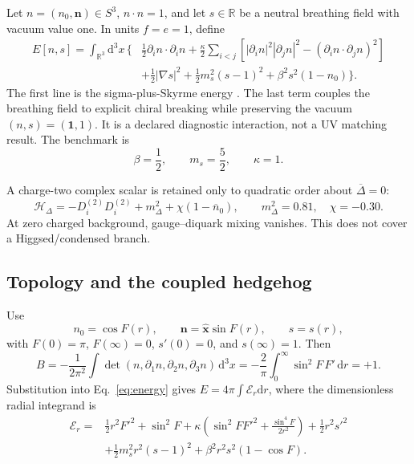 \documentclass[11pt]{article}
\theoremstyle{definition}
\theoremstyle{remark}
\newcommand{\dd}{\mathrm d}
\newcommand{\cH}{\mathcal H}
\newcommand{\RR}{\mathbb R}
\newcommand{\one}{\mathbf 1}
\begin{document}
Let \(n=(n_0,\bm n)\in S^3\), \(n\cdot n=1\), and let \(s\in\RR\) be a
neutral breathing field with vacuum value one.  In units \(f=e=1\), define
\begin{align}
 E[n,s]=\int_{\RR^3}\!\dd^3x\,\bigg\{&
 \frac12\partial_i n\cdot\partial_i n
 +\frac{\kappa}{2}\sum_{i<j}
 \left[|\partial_i n|^2|\partial_j n|^2
 -(\partial_i n\cdot\partial_j n)^2\right]\nonumber\\
 &+\frac12|\nabla s|^2+\frac12m_s^2(s-1)^2
 +\beta^2s^2(1-n_0)\bigg\}.
 \label{eq:energy}
\end{align}
The first line is the sigma-plus-Skyrme energy
\cite{Skyrme1961APE6,AdkinsNappiWitten1983APE6}.  The last term couples the
breathing field to explicit chiral breaking while preserving the vacuum
\((n,s)=(\one,1)\).  It is a declared diagnostic interaction, not a UV
matching result.  The benchmark is
\begin{equation}
 \beta=\frac12,\qquad m_s=\frac52,\qquad \kappa=1.
 \label{eq:parameters}
\end{equation}

A charge-two complex scalar is retained only to quadratic order about
\(\overline\Delta=0\):
\begin{equation}
 \cH_\Delta=-D_i^{(2)}D_i^{(2)}+m_\Delta^2
 +\chi(1-\overline n_0),\qquad
 m_\Delta^2=0.81,\quad\chi=-0.30.
 \label{eq:diquark}
\end{equation}
At zero charged background, gauge--diquark mixing vanishes.  This does not
cover a Higgsed/condensed branch.

\subsection{Topology and the coupled hedgehog}

Use
\begin{equation}
 n_0=\cos F(r),\qquad \bm n=\widehat{\bm x}\sin F(r),
 \qquad s=s(r),
 \label{eq:hedgehog}
\end{equation}
with \(F(0)=\pi\), \(F(\infty)=0\), \(s'(0)=0\), and
\(s(\infty)=1\).  Then
\begin{equation}
 B=-\frac{1}{2\pi^2}\int\det(n,\partial_1n,\partial_2n,
 \partial_3n)\,\dd^3x
 =-\frac2\pi\int_0^\infty\sin^2F\,F'\,\dd r=+1.
 \label{eq:baryon}
\end{equation}
Substitution into Eq.~\eqref{eq:energy} gives \(E=4\pi\int\mathcal E_r\dd r\),
where the dimensionless radial integrand is
\begin{align}
 \mathcal E_r={}&\frac12r^2F'^2+\sin^2F
 +\kappa\left(\sin^2F F'^2+\frac{\sin^4F}{2r^2}\right)
 +\frac12r^2s'^2\nonumber\\
 &+\frac12m_s^2r^2(s-1)^2+\beta^2r^2s^2(1-\cos F).
 \label{eq:radial-energy}
\end{align}
\end{document}
